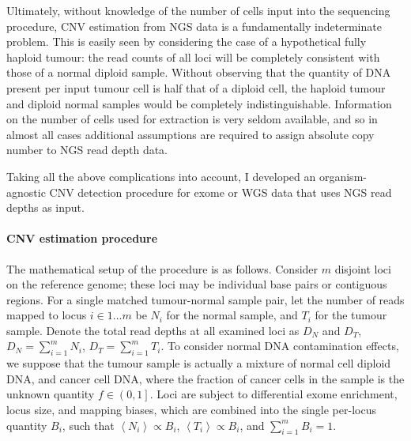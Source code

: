 \documentclass[thesis.tex]{subfiles}
\begin{document}
Ultimately, without knowledge of the number of cells input into the sequencing procedure, \gls{CNV} estimation from \gls{NGS} data is a fundamentally indeterminate problem.  This is easily seen by considering the case of a hypothetical fully haploid tumour: the read counts of all loci will be completely consistent with those of a normal diploid sample.  Without observing that the quantity of DNA present per input tumour cell is half that of a diploid cell, the haploid tumour and diploid normal samples would be completely indistinguishable.  Information on the number of cells used for extraction is very seldom available, and so in almost all cases additional assumptions are required to assign absolute copy number to \gls{NGS} read depth data.

Taking all the above complications into account, I developed an organism-agnostic \gls{CNV} detection procedure for exome or \gls{WGS} data that uses \gls{NGS} read depths as input.  

\paragraph{\Acrlong{CNV} estimation procedure}

The mathematical setup of the procedure is as follows.  Consider $m$ disjoint loci on the reference genome; these loci may be individual base pairs or contiguous regions.  For a single matched tumour-normal sample pair, let the number of reads mapped to locus $i \in 1 \dots m$ be $N_i$ for the normal sample, and $T_i$ for the tumour sample.  Denote the total read depths at all examined loci as $D_N$ and $D_T$, $D_N = \sum_{i=1}^{m} N_i$, $D_T = \sum_{i=1}^{m} T_i$. To consider normal DNA contamination effects, we suppose that the tumour sample is actually a mixture of normal cell diploid DNA, and cancer cell DNA, where the fraction of cancer cells in the sample is the unknown quantity $f \in \left(0, 1\right]$.  Loci are subject to differential exome enrichment, locus size, and mapping biases, which are combined into the single per-locus quantity $B_i$, such that $\left<N_i\right> \propto B_i$, $\left<T_i\right> \propto B_i$, and $\sum_{i=1}^{m} B_i = 1$.
\end{document}
